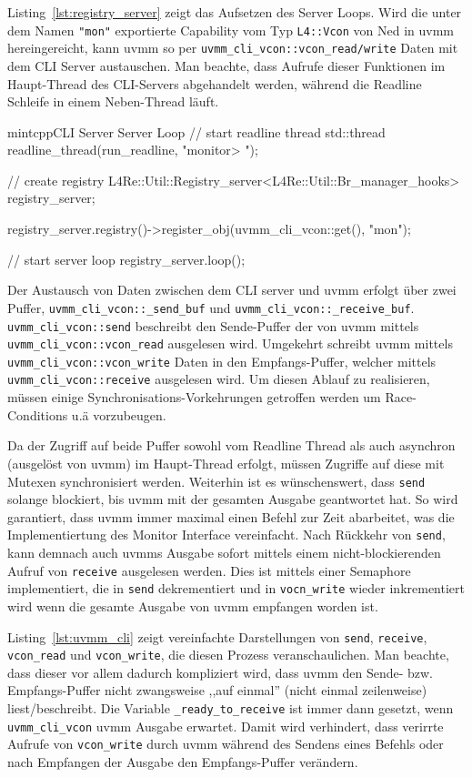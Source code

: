Listing~\ref{lst:registry_server} zeigt das Aufsetzen des Server Loops.  Wird
die unter dem Namen \texttt{"mon"} exportierte Capability vom Typ
\texttt{L4::Vcon} von Ned in uvmm hereingereicht, kann uvmm so per
\texttt{uvmm\_cli\_vcon::vcon\_read/write} Daten mit dem CLI Server
austauschen. Man beachte, dass Aufrufe dieser Funktionen im Haupt-Thread des
CLI-Servers abgehandelt werden, während die Readline Schleife in einem
Neben-Thread läuft.

\begin{mintlisting}[label=lst:registry_server]{mintcpp}{CLI Server Server Loop}
// start readline thread
std::thread readline_thread(run_readline, "monitor> ");

// create registry
L4Re::Util::Registry_server<L4Re::Util::Br_manager_hooks> registry_server;

registry_server.registry()->register_obj(uvmm_cli_vcon::get(), "mon");

// start server loop
registry_server.loop();
\end{mintlisting}

Der Austausch von Daten zwischen dem CLI server und uvmm erfolgt über zwei
Puffer, \texttt{uvmm\_cli\_vcon::\_send\_buf} und
\texttt{uvmm\_cli\_vcon::\_receive\_buf}.  \texttt{uvmm\_cli\_vcon::send}
beschreibt den Sende-Puffer der von uvmm mittels
\texttt{uvmm\_cli\_vcon::vcon\_read} ausgelesen wird. Umgekehrt schreibt uvmm
mittels \texttt{uvmm\_cli\_vcon::vcon\_write} Daten in den Empfangs-Puffer,
welcher mittels \texttt{uvmm\_cli\_vcon::receive} ausgelesen wird.  Um diesen
Ablauf zu realisieren, müssen einige Synchronisations-Vorkehrungen getroffen
werden um Race-Conditions u.ä vorzubeugen.

Da der Zugriff auf beide Puffer sowohl vom Readline Thread als auch asynchron
(ausgelöst von uvmm) im Haupt-Thread  erfolgt, müssen Zugriffe auf diese mit
Mutexen synchronisiert werden.  Weiterhin ist es wünschenswert, dass
\texttt{send} solange blockiert, bis uvmm mit der gesamten Ausgabe geantwortet
hat. So wird garantiert, dass uvmm immer maximal einen Befehl zur Zeit
abarbeitet, was die Implementiertung des Monitor Interface vereinfacht. Nach
Rückkehr von \texttt{send}, kann demnach auch uvmms Ausgabe sofort mittels
einem nicht-blockierenden Aufruf von \texttt{receive} ausgelesen werden.  Dies
ist mittels einer Semaphore implementiert, die in \texttt{send} dekrementiert
und in \texttt{vocn\_write} wieder inkrementiert wird wenn die gesamte Ausgabe
von uvmm empfangen worden ist.

Listing~\ref{lst:uvmm_cli} zeigt vereinfachte Darstellungen von \texttt{send},
\texttt{receive}, \texttt{vcon\_read} und \texttt{vcon\_write}, die diesen
Prozess veranschaulichen. Man beachte, dass dieser vor allem dadurch
kompliziert wird, dass uvmm den Sende- bzw. Empfangs-Puffer nicht zwangsweise
,,auf einmal'' (nicht einmal zeilenweise) liest/beschreibt. Die Variable
\texttt{\_ready\_to\_receive} ist immer dann gesetzt, wenn
\texttt{uvmm\_cli\_vcon} uvmm Ausgabe erwartet. Damit wird verhindert, dass
verirrte Aufrufe von \texttt{vcon\_write} durch uvmm während des Sendens eines
Befehls oder nach Empfangen der Ausgabe den Empfangs-Puffer verändern.

